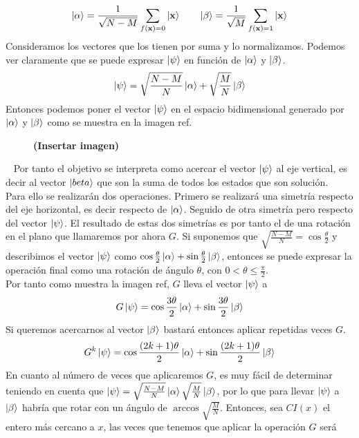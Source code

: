 \documentclass[a4paper]{article}
\numberwithin{equation}{section}
\begin{document}
\begin{equation}
\ket{\alpha} = \frac{1}{\sqrt{N-M}} \sum_{f(\mathbf{x}) = 0} \ket{\mathbf{x}}
\qquad
\ket{\beta} = \frac{1}{\sqrt{M}} \sum_{f(\mathbf{x}) = 1} \ket{\mathbf{x}}
\end{equation}
Consideramos los vectores que los tienen por suma y lo normalizamos. Podemos ver claramente que se puede expresar $\ket{\psi}$ en función de $\ket{\alpha}$ y $\ket{\beta}$.
\begin{equation}
\ket{\psi} = \sqrt{\frac{N-M}{N}}\ket{\alpha} + \sqrt{\frac{M}{N}}\ket{\beta}
\end{equation}
Entonces podemos poner el vector $\ket{\psi}$ en el espacio bidimensional generado por $\ket{\alpha}$ y $\ket{\beta}$ como se muestra en la imagen ref.

\begin{figure}[h]
\textbf{(Insertar imagen)}
\end{figure}\ \linebreak
Por tanto el objetivo se interpreta como acercar el vector $\ket{\psi}$ al eje vertical, es decir al vector $\ket{beta}$ que son la suma de todos los estados que son solución.\\
\linebreak
Para ello se realizarán dos operaciones. Primero se realizará una simetría respecto del eje horizontal, es decir respecto de $\ket{\alpha}$. Seguido de otra simetría pero respecto del vector $\ket{\psi}$. El resultado de estas dos simetrías es por tanto el de una rotación en el plano que llamaremos por ahora $G$. Si suponemos que $\sqrt{\frac{N-M}{N}} = \cos \frac{\theta}{2}$ y describimos el vector $\ket{\psi}$ como $\cos \frac{\theta}{2} \ket{\alpha} + \sin \frac{\theta}{2} \ket{\beta}$, entonces se puede expresar la operación final como una rotación de ángulo $\theta$, con $0<\theta\leq \frac{\pi}{2}$.\\
\linebreak
Por tanto como muestra la imagen ref, $G$ lleva el vector $\ket{\psi}$ a
\begin{equation}
G\ket{\psi} = \cos \frac{3\theta}{2}\ket{\alpha} + \sin \frac{3\theta}{2} \ket{\beta}
\end{equation}
Si queremos acercarnos al vector $\ket{\beta}$ bastará entonces aplicar repetidas veces $G$.
\begin{equation}
G^k \ket{\psi} = \cos \frac{(2k+1)\theta}{2}\ket{\alpha} + \sin \frac{(2k+1)\theta}{2} \ket{\beta}
\end{equation}
En cuanto al número de veces que aplicaremos $G$, es muy fácil de determinar teniendo en cuenta que $\ket{\psi} = \sqrt{\frac{N-M}{N}}\ket{\alpha} \sqrt{\frac{M}{N}}\ket{\beta}$, por lo que para llevar $\ket{\psi}$ a $\ket{\beta}$ habría que rotar con un ángulo de $\arccos \sqrt{\frac{M}{N}}$. Entonces, sea $CI(x)$ el entero más cercano a $x$, las veces que tenemos que aplicar la operación $G$ será
\end{document}
